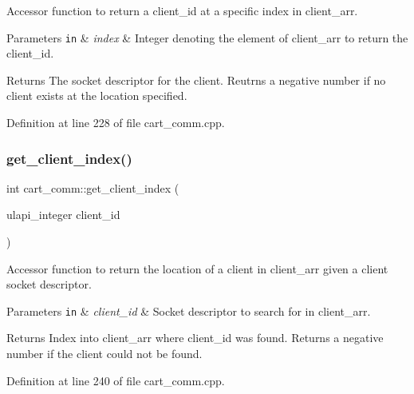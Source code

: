 Accessor function to return a client\+\_\+id at a specific index in client\+\_\+arr. 
\begin{DoxyParams}[1]{Parameters}
\mbox{\tt in}  & {\em index} & Integer denoting the element of client\+\_\+arr to return the client\+\_\+id. \\
\hline
\end{DoxyParams}
\begin{DoxyReturn}{Returns}
The socket descriptor for the client. Reutrns a negative number if no client exists at the location specified. 
\end{DoxyReturn}


Definition at line 228 of file cart\+\_\+comm.\+cpp.

\mbox{\label{classcart__comm_a6dcf8cc0eedecebcd436653da2ab680d}} 
\subsubsection{\texorpdfstring{get\+\_\+client\+\_\+index()}{get\_client\_index()}}
{\footnotesize\ttfamily int cart\+\_\+comm\+::get\+\_\+client\+\_\+index (\begin{DoxyParamCaption}\item[{ulapi\+\_\+integer}]{client\+\_\+id }\end{DoxyParamCaption})}

Accessor function to return the location of a client in client\+\_\+arr given a client socket descriptor. 
\begin{DoxyParams}[1]{Parameters}
\mbox{\tt in}  & {\em client\+\_\+id} & Socket descriptor to search for in client\+\_\+arr. \\
\hline
\end{DoxyParams}
\begin{DoxyReturn}{Returns}
Index into client\+\_\+arr where client\+\_\+id was found. Returns a negative number if the client could not be found. 
\end{DoxyReturn}


Definition at line 240 of file cart\+\_\+comm.\+cpp.

\mbox{\label{classcart__comm_a00fdba1bcb1d3e7234c83a1b2d692947}} 
